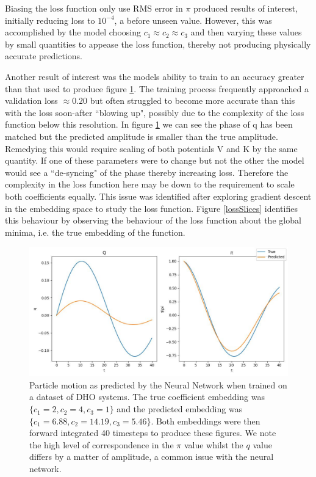 \documentclass[10pt]{iopart}
\begin{document}
Biasing the loss function only use RMS error in $\pi$ produced results of interest, initially reducing loss to $10^{-4}$, a before unseen value. However, this was accomplished by the model choosing $c_1\approx c_2\approx c_3$ and then varying these values by small quantities to appease the loss function, thereby not producing physically accurate predictions. 

Another result of interest was the models ability to train to an accuracy greater than that used to produce figure \ref{model_comp}. The training process frequently approached a validation loss $\approx 0.20$ but often struggled to become more accurate than this with the loss soon-after ``blowing up", possibly due to the complexity of the loss function below this resolution. In figure \ref{model_comp} we can see the phase of q has been matched but the predicted amplitude is smaller than the true amplitude. Remedying this would require scaling of both potentials V and K by the same quantity. If one of these parameters were to change but not the other the model would see a ``de-syncing" of the phase thereby increasing loss. Therefore the complexity in the loss function here may be down to the requirement to scale both coefficients equally. This issue was identified after exploring gradient descent in the embedding space to study the loss function. Figure \ref{lossSlices} identifies this behaviour by observing the behaviour of the loss function about the global minima, i.e. the true embedding of the function.

\begin{figure}
	\centering
	\label{model_comp}
	\includegraphics[width=\textwidth]{modelComp.jpg}
	\caption{Particle motion as predicted by the Neural Network when trained on a dataset of DHO systems. The true coefficient embedding was $\{c_1=2,c_2=4,c_3=1\}$ and the predicted embedding was$\{c_1=6.88,c_2=14.19,c_3=5.46\}$. Both embeddings were then forward integrated 40 timesteps to produce these figures. We note the high level of correspondence in the $\pi$ value whilst the $q$ value differs by a matter of amplitude, a common issue with the neural network.}
\end{figure}
\end{document}
